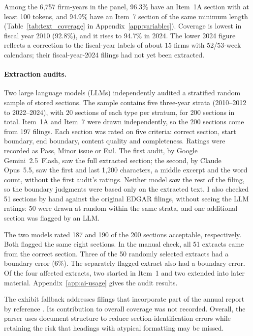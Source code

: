 Among the 6{,}757 firm-years in the panel, 96.3\% have an Item~1A section
with at least 100 tokens, and 94.9\% have an Item~7 section of the same
minimum length (Table~\ref{tab:text_coverage} in
Appendix~\ref{app:variables}). Coverage is lowest in fiscal year 2010
(92.8\%), and it rises to 94.7\% in 2024. The lower 2024 figure reflects a
correction to the fiscal-year labels of about 15 firms with 52/53-week
calendars; their fiscal-year-2024 filings had not yet been extracted.

\paragraph{Extraction audits.} Two large language models (LLMs) independently
audited a stratified random sample of stored sections. The sample contains
five three-year strata (2010--2012 to 2022--2024), with 20 sections of each
type per stratum, for 200 sections in total. Item~1A and Item~7 were drawn
independently, so the 200 sections come from 197 filings. Each section was
rated on five criteria: correct section, start boundary, end boundary,
content quality and completeness. Ratings were recorded as Pass, Minor issue
or Fail. The first audit, by Google Gemini~2.5~Flash, saw the full
extracted section; the second, by Claude Opus~5.5, saw the first and last
1{,}200 characters, a middle excerpt and the word count, without the first audit's ratings. Neither model saw the rest of the filing, so the boundary
judgments were based only on the extracted text. I also checked 51 sections by hand
against the original EDGAR filings, without seeing the LLM ratings: 50 were
drawn at random within the same strata, and one additional section was
flagged by an LLM.

The two models rated 187 and 190 of the 200 sections acceptable, respectively. Both flagged the same eight sections. In the manual check, all 51 extracts came from the correct section. Three of the 50 randomly selected extracts had a boundary error (6\%). The separately flagged extract also had a boundary error. Of the four affected extracts, two started in Item~1 and two extended into later material. Appendix~\ref{app:ai-usage} gives the audit results.

The exhibit fallback addresses filings that incorporate part of the annual report by reference \parencite[General Instruction G(2)]{sec_form10k_2014}. Its contribution to overall coverage was not recorded. Overall, the parser uses document structure to reduce section-identification
errors while retaining the risk that headings with atypical formatting may be
missed.
